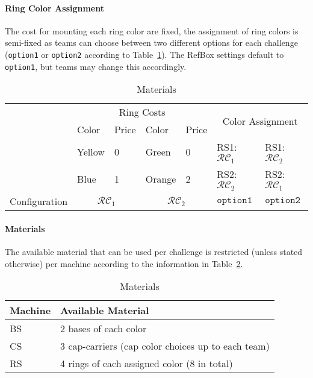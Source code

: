 \documentclass[12pt,twoside]{article}
\newcommand{\reftab}[1]{Table~\ref{#1}}
\begin{document}
\paragraph{Ring Color Assignment}
The cost for mounting each ring color are fixed, the assignment of ring colors
is semi-fixed as teams can choose between two different options for each
challenge (\texttt{option1} or \texttt{option2} according to
\reftab{tab:ring-costs}).
The RefBox settings default to \texttt{option1}, but teams may change this
accordingly.

\newcommand{\colconfig}{\mathcal{RC}}
\begin{table}[!htb]
 \centering
 \begin{tabular}{l|l|l||l|l||l|l}
  & \multicolumn{4}{c||}{Ring Costs}
  & \multicolumn{2}{c}{\multirow{2}{*}{Color Assignment }}\\\cline{2-5}
  & Color  & Price & Color  & Price & \multicolumn{2}{c}{}\\\cline{2-7}
  & Yellow & 0 & Green & 0
  & RS1: $\colconfig_1$ & RS1: $\colconfig_2$ \\
  & Blue  & 1 & Orange & 2
  & RS2: $\colconfig_2$ & RS2: $\colconfig_1$ \\\hline\hline
  Configuration & \multicolumn{2}{c||}{$\colconfig_1$}
  & \multicolumn{2}{c||}{$\colconfig_2$}
  & $\texttt{option1}$ & $\texttt{option2}$\\
 \end{tabular}
 \caption{Materials}
 \label{tab:ring-costs}
\end{table}

\paragraph{Materials}\label{sec:materials}
The available material that can be used per challenge is restricted
(unless stated otherwise) per machine according to the information in
\reftab{tab:materials}.
\begin{table}[!htb]
 \centering
  \begin{tabularx}{\linewidth}{l|l}
   Machine & Available Material  \\\hline
   \ac{BS} & 2 bases of each color \\
   \ac{CS} & 3 cap-carriers (cap color choices up to each team)  \\
   \ac{RS} & 4 rings of each assigned color (8 in total)  \\
  \end{tabularx}
 \caption{Materials}
 \label{tab:materials}
\end{table}
\end{document}
